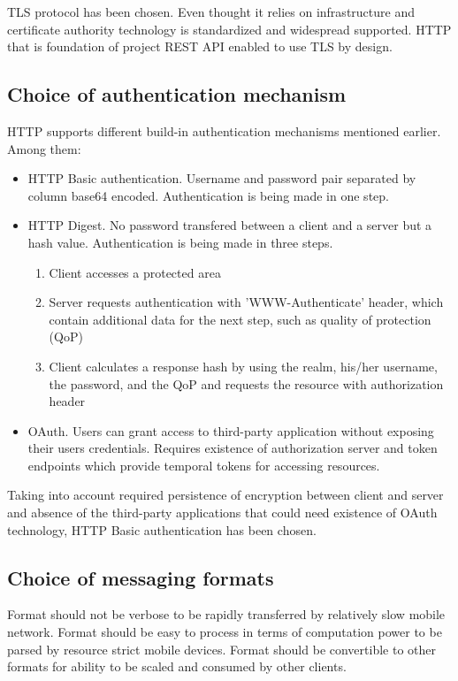 \documentclass[thesis=M,english]{FITthesis}[2012/10/20]
\begin{document}
TLS protocol has been chosen. Even thought it relies on infrastructure and certificate authority technology is standardized and widespread supported. HTTP that is foundation of project REST API enabled to use TLS by design.

\subsection{Choice of authentication mechanism}

HTTP supports different build-in authentication mechanisms mentioned earlier. Among them:

\begin{itemize}
\item HTTP Basic authentication. Username and password pair separated by column base64 encoded. Authentication is being made in one step.
	\item HTTP Digest. No password transfered between a client and a server but a hash value. Authentication is being made in three steps. 
	\begin{enumerate}
		\item Client accesses a protected area
		\item Server requests authentication with 'WWW-Authenticate' header, which contain additional data for the next step, such as quality of protection (QoP)
		\item Client calculates a response hash by using the realm, his/her username, the password, and the QoP and requests the resource with authorization header

	\end{enumerate}

	\item OAuth. Users can grant access to third-party application without exposing their users credentials. Requires existence of authorization server and token endpoints which provide temporal tokens for accessing resources.
\end{itemize}

Taking into account required persistence of encryption between client and server and absence of the third-party applications that could need existence of OAuth technology, HTTP Basic authentication has been chosen. 

\subsection{Choice of messaging formats}

Format should not be verbose to be rapidly transferred by relatively slow mobile network. Format should be easy to process in terms of computation power to be parsed by resource strict mobile devices.
Format should be convertible to other formats for ability to be scaled and consumed by other clients.
\end{document}
